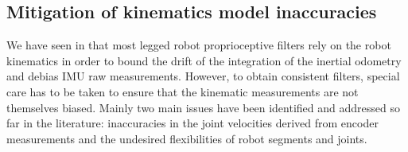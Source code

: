 \subsection{Mitigation of kinematics model inaccuracies}


We have seen in  that most legged robot proprioceptive filters rely on the robot kinematics in order to bound the drift of the integration
of the inertial odometry and debias IMU raw measurements. However, to obtain consistent filters, special care has to be taken to ensure that the kinematic
measurements are not themselves biased. Mainly two main issues have been identified and addressed so far in the literature: inaccuracies in the joint velocities derived from
encoder measurements and the undesired flexibilities of robot segments and joints.

